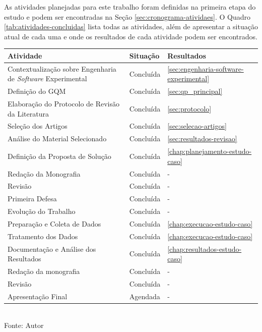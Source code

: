 As atividades planejadas para este trabalho foram definidas na primeira etapa do estudo e podem ser encontradas na Seção \ref{sec:cronograma-atividaes}. O Quadro \ref{tab:atividades-concluidas} lista todas as atividades, além de apresentar a situação atual de cada uma e onde os resultados de cada atividade podem ser encontrados.

\begin{quadro}[h]
    \centering
    \caption{Atividades Concluídas}
    \begin{tabular}{|p{9cm}|p{1.8cm}|p{2.2cm}|}
        \hline
        \textbf{Atividade} & \textbf{Situação} & \textbf{Resultados} \\
        \hline
        Contextualização sobre Engenharia de \textit{Software} Experimental & Concluída & \ref{sec:engenharia-software-experimental} \\
        \hline
        Definição do GQM & Concluída & \ref{sec:qp_principal} \\
        \hline
        Elaboração do Protocolo de Revisão da Literatura & Concluída & \ref{sec:protocolo} \\
        \hline
        Seleção dos Artigos & Concluída & \ref{sec:selecao-artigos} \\
        \hline
        Análise do Material Selecionado & Concluída & \ref{sec:resultados-revisao} \\
        \hline
        Definição da Proposta de Solução & Concluída & \ref{chap:planejamento-estudo-caso} \\
        \hline
        Redação da Monografia & Concluída & - \\
        \hline
        Revisão & Concluída & - \\
        \hline
        Primeira Defesa & Concluída & - \\
        \hline
        Evolução do Trabalho & Concluída & - \\
        \hline
        Preparação e Coleta de Dados & Concluída & \ref{chap:execucao-estudo-caso} \\
        \hline
        Tratamento dos Dados & Concluída & \ref{chap:execucao-estudo-caso} \\
        \hline
        Documentação e Análise dos Resultados & Concluída & \ref{chap:resultados-estudo-caso} \\
        \hline
        Redação da monografia & Concluída & - \\
        \hline
        Revisão & Concluída & - \\
        \hline
        Apresentação Final & Agendada & - \\
        \hline
    \end{tabular} \\[0.5em]
    Fonte: Autor
    \label{tab:atividades-concluidas}
\end{quadro}


